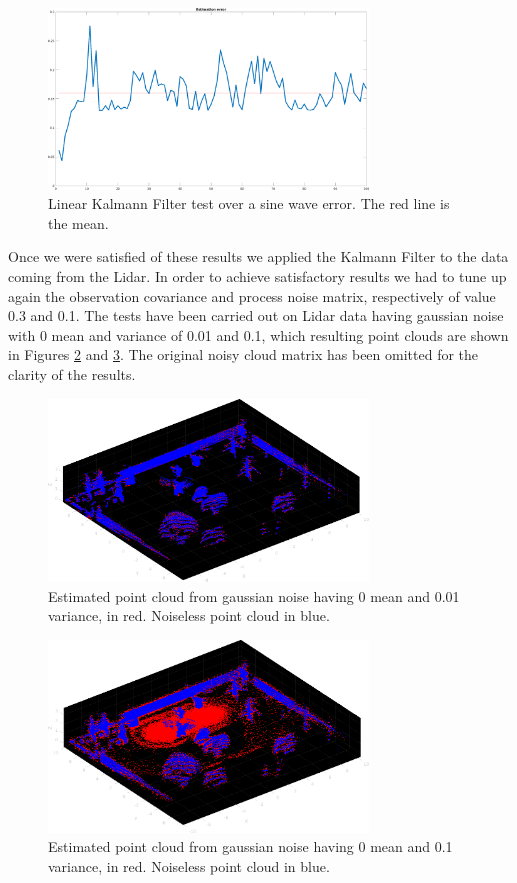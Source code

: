 \documentclass[twocolumn, a4paper]{article}
\begin{document}
\vspace{0.5cm}
\begin{figure}[h]
    \centering
    \includegraphics[width=8.5cm]{"../Report_images/Denoising_KF_sine_error"}
    \caption{Linear Kalmann Filter test over a sine wave error. The red line is
             the mean.}
    \label{fig:KF_sine_err}
\end{figure}
Once we were satisfied of these results we applied the Kalmann Filter to the
data coming from the Lidar. In order to achieve satisfactory results we had
to tune up again the observation covariance and process noise matrix, 
respectively of value 0.3 and 0.1. The tests have been carried out on
Lidar data having gaussian noise with 0 mean and variance of 0.01 and 0.1, which
resulting point clouds are shown in Figures \ref{fig:KF_cloud_01} and
\ref{fig:KF_cloud_1}. The original noisy cloud matrix has been omitted for the
clarity of the results.
\vspace{0.5cm}
\begin{figure}[h!]
    \centering
    \includegraphics[width=8.5cm]{"../Report_images/Cloud_01_estimation_KF.png"}
    \caption{Estimated point cloud from gaussian noise having 0 mean and 0.01
             variance, in red. Noiseless point cloud in blue.}
    \label{fig:KF_cloud_01}
\end{figure}
\vspace{0.5cm}
\begin{figure}[h!]
    \centering
    \includegraphics[width=8.5cm]{"../Report_images/Cloud_1_estimation_KF.png"}
    \caption{Estimated point cloud from gaussian noise having 0 mean and 0.1
             variance, in red. Noiseless point cloud in blue.}
    \label{fig:KF_cloud_1}
\end{figure}
\end{document}
